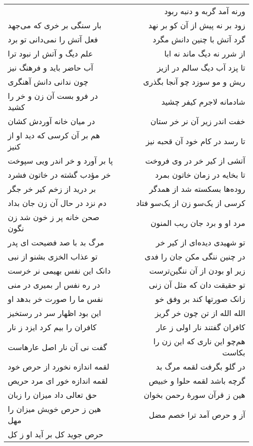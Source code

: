 \begin{center}
\begin{longtable}{l p{0.5cm} r}
&&
ورنه آمد گربه و دنبه ربود
\\
بار سنگی بر خری که می‌جهد
&&
زود بر نه پیش از آن کو بر نهد
\\
فعل آتش را نمی‌دانی تو برد
&&
گرد آتش با چنین دانش مگرد
\\
علم دیگ و آتش ار نبود ترا
&&
از شرر نه دیگ ماند نه ابا
\\
آب حاضر باید و فرهنگ نیز
&&
تا پزد آب دیگ سالم در ازیز
\\
چون ندانی دانش آهنگری
&&
ریش و مو سوزد چو آنجا بگذری
\\
در فرو بست آن زن و خر را کشید
&&
شادمانه لاجرم کیفر چشید
\\
در میان خانه آوردش کشان
&&
خفت اندر زیر آن نر خر ستان
\\
هم بر آن کرسی که دید او از کنیز
&&
تا رسد در کام خود آن قحبه نیز
\\
پا بر آورد و خر اندر ویی سپوخت
&&
آتشی از کیر خر در وی فروخت
\\
خر مؤدب گشته در خاتون فشرد
&&
تا بخایه در زمان خاتون بمرد
\\
بر درید از زخم کیر خر جگر
&&
روده‌ها بسکسته شد از همدگر
\\
دم نزد در حال آن زن جان بداد
&&
کرسی از یک‌سو زن از یک‌سو فتاد
\\
صحن خانه پر ز خون شد زن نگون
&&
مرد او و برد جان ریب المنون
\\
مرگ بد با صد فضیحت ای پدر
&&
تو شهیدی دیده‌ای از کیر خر
\\
تو عذاب الخزی بشنو از نبی
&&
در چنین ننگی مکن جان را فدی
\\
دانک این نفس بهیمی نر خرست
&&
زیر او بودن از آن ننگین‌ترست
\\
در ره نفس ار بمیری در منی
&&
تو حقیقت دان که مثل آن زنی
\\
نفس ما را صورت خر بدهد او
&&
زانک صورتها کند بر وفق خو
\\
این بود اظهار سر در رستخیز
&&
الله الله از تن چون خر گریز
\\
کافران را بیم کرد ایزد ز نار
&&
کافران گفتند نار اولی ز عار
\\
گفت نی آن نار اصل عارهاست
&&
هم‌چو این ناری که این زن را بکاست
\\
لقمه اندازه نخورد از حرص خود
&&
در گلو بگرفت لقمه مرگ بد
\\
لقمه اندازه خور ای مرد حریص
&&
گرچه باشد لقمه حلوا و خبیص
\\
حق تعالی داد میزان را زبان
&&
هین ز قرآن سورهٔ رحمن بخوان
\\
هین ز حرص خویش میزان را مهل
&&
آز و حرص آمد ترا خصم مضل
\\
حرص جوید کل بر آید او ز کل

\end{longtable}
\end{center}
